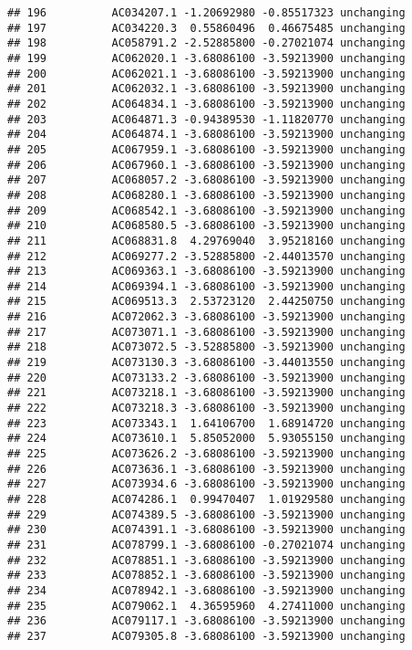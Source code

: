 \documentclass[]{article}
\begin{document}
\begin{verbatim}
## 196          AC034207.1 -1.20692980 -0.85517323 unchanging
## 197          AC034220.3  0.55860496  0.46675485 unchanging
## 198          AC058791.2 -2.52885800 -0.27021074 unchanging
## 199          AC062020.1 -3.68086100 -3.59213900 unchanging
## 200          AC062021.1 -3.68086100 -3.59213900 unchanging
## 201          AC062032.1 -3.68086100 -3.59213900 unchanging
## 202          AC064834.1 -3.68086100 -3.59213900 unchanging
## 203          AC064871.3 -0.94389530 -1.11820770 unchanging
## 204          AC064874.1 -3.68086100 -3.59213900 unchanging
## 205          AC067959.1 -3.68086100 -3.59213900 unchanging
## 206          AC067960.1 -3.68086100 -3.59213900 unchanging
## 207          AC068057.2 -3.68086100 -3.59213900 unchanging
## 208          AC068280.1 -3.68086100 -3.59213900 unchanging
## 209          AC068542.1 -3.68086100 -3.59213900 unchanging
## 210          AC068580.5 -3.68086100 -3.59213900 unchanging
## 211          AC068831.8  4.29769040  3.95218160 unchanging
## 212          AC069277.2 -3.52885800 -2.44013570 unchanging
## 213          AC069363.1 -3.68086100 -3.59213900 unchanging
## 214          AC069394.1 -3.68086100 -3.59213900 unchanging
## 215          AC069513.3  2.53723120  2.44250750 unchanging
## 216          AC072062.3 -3.68086100 -3.59213900 unchanging
## 217          AC073071.1 -3.68086100 -3.59213900 unchanging
## 218          AC073072.5 -3.52885800 -3.59213900 unchanging
## 219          AC073130.3 -3.68086100 -3.44013550 unchanging
## 220          AC073133.2 -3.68086100 -3.59213900 unchanging
## 221          AC073218.1 -3.68086100 -3.59213900 unchanging
## 222          AC073218.3 -3.68086100 -3.59213900 unchanging
## 223          AC073343.1  1.64106700  1.68914720 unchanging
## 224          AC073610.1  5.85052000  5.93055150 unchanging
## 225          AC073626.2 -3.68086100 -3.59213900 unchanging
## 226          AC073636.1 -3.68086100 -3.59213900 unchanging
## 227          AC073934.6 -3.68086100 -3.59213900 unchanging
## 228          AC074286.1  0.99470407  1.01929580 unchanging
## 229          AC074389.5 -3.68086100 -3.59213900 unchanging
## 230          AC074391.1 -3.68086100 -3.59213900 unchanging
## 231          AC078799.1 -3.68086100 -0.27021074 unchanging
## 232          AC078851.1 -3.68086100 -3.59213900 unchanging
## 233          AC078852.1 -3.68086100 -3.59213900 unchanging
## 234          AC078942.1 -3.68086100 -3.59213900 unchanging
## 235          AC079062.1  4.36595960  4.27411000 unchanging
## 236          AC079117.1 -3.68086100 -3.59213900 unchanging
## 237          AC079305.8 -3.68086100 -3.59213900 unchanging

\end{verbatim}
\end{document}

